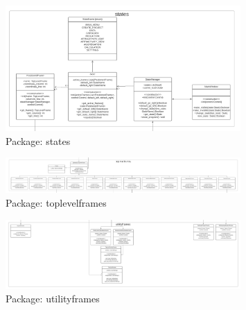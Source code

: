 \documentclass[parskip=full]{report} %
\begin{document}
\hypertarget{states}{
\begin{figure}[hbt!]
  \centering
\includegraphics[width=0.8\textwidth]
        {pictures/states.png}
  \caption{Package: states}
  \label{fig:states}
\end{figure}
}

\hypertarget{toplevelframes}{
\begin{figure}[hbt!]
  \centering
\includegraphics[width=0.8\textwidth]
        {pictures/toplevelframes.png}
  \caption{Package: toplevelframes}
  \label{fig:toplevelframes}
\end{figure}
}

\hypertarget{utilityframes}{
\begin{figure}[hbt!]
  \centering
\includegraphics[width=0.8\textwidth]
        {pictures/utilityframes.png}
  \caption{Package: utilityframes}
  \label{fig:utilityframes}
\end{figure}
}
\end{document}
